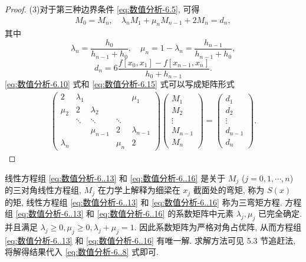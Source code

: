 \documentclass[../../main.tex]{subfiles}%
\begin{document}
\begin{proof}
(3)对于第三种边界条件 \eqref{eq:数值分析-6.5}, 可得
\begin{align}
M_0 = M_n, \quad \lambda_n M_1 + \mu_n M_{n - 1} + 2 M_n = d_n, \label{eq:数值分析-6.15}
\end{align}
其中
\[
\lambda_n = \frac{h_0}{h_{n - 1} + h_0}, \quad \mu_n = 1 - \lambda_n = \frac{h_{n - 1}}{h_{n - 1} + h_0},
\]
\[
d_n = 6 \frac{f[x_0, x_1] - f[x_{n - 1}, x_n]}{h_0 + h_{n - 1}}.
\]
\eqref{eq:数值分析-6.10} 式和 \eqref{eq:数值分析-6.15} 式可以写成矩阵形式
\begin{align}
\begin{pmatrix}
2 & \lambda_1 & & & \mu_1 \\
\mu_2 & 2 & \lambda_2 & & \\
& \ddots & \ddots & \ddots & \\
& & \mu_{n - 1} & 2 & \lambda_{n - 1} \\
\lambda_n & & & \mu_n & 2
\end{pmatrix}
\begin{pmatrix}
M_1 \\
M_2 \\
\vdots \\
M_{n - 1} \\
M_n
\end{pmatrix}
=
\begin{pmatrix}
d_1 \\
d_2 \\
\vdots \\
d_{n - 1} \\
d_n
\end{pmatrix}. \label{eq:数值分析-6..16}
\end{align}

\end{proof}
\begin{remark}
线性方程组 \eqref{eq:数值分析-6..13} 和 \eqref{eq:数值分析-6..16} 是关于 $M_j$ ($j = 0, 1, \cdots, n$) 的三对角线性方程组, $M_j$ 在力学上解释为细梁在 $x_j$ 截面处的弯矩, 称为 $S(x)$ 的矩, 线性方程组 \eqref{eq:数值分析-6..13} 和 \eqref{eq:数值分析-6..16} 称为三弯矩方程. 方程组 \eqref{eq:数值分析-6..13} 和 \eqref{eq:数值分析-6..16} 的系数矩阵中元素 $\lambda_j, \mu_j$ 已完全确定. 并且满足 $\lambda_j \geqslant 0, \mu_j \geqslant 0, \lambda_j + \mu_j = 1$. 因此系数矩阵为严格对角占优阵, 从而方程组 \eqref{eq:数值分析-6..13} 和 \eqref{eq:数值分析-6..16} 有唯一解. 求解方法可见 5.3 节追赶法, 将解得结果代入 \eqref{eq:数值分析-6..8} 式即可.
\end{remark}
\end{document}
